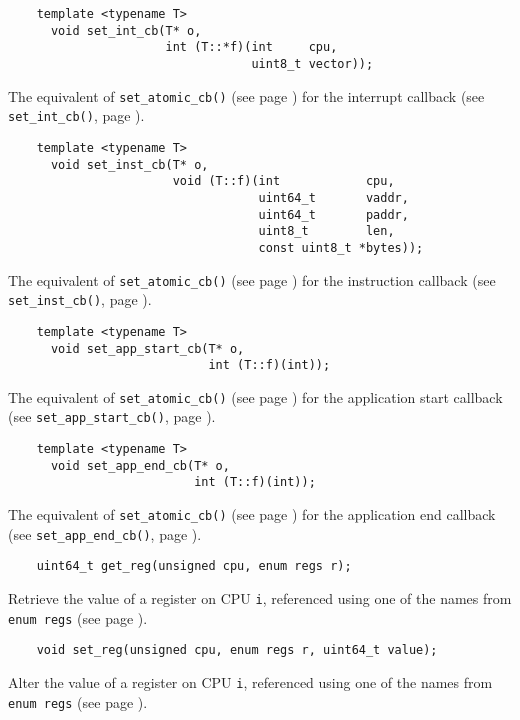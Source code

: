 \documentclass[letterpaper, 10pt]{book}
\begin{document}
\label{tf:set_int_cb} \begin{verbatim}
    template <typename T>
      void set_int_cb(T* o,
                      int (T::*f)(int     cpu, 
                                  uint8_t vector));
\end{verbatim}
The equivalent of \texttt{set\_atomic\_cb()} (see page
\pageref{tf:set_atomic_cb}) for the interrupt callback (see 
\texttt{set\_int\_cb()}, page \pageref{func:set_int_cb}).

\label{tf:set_inst_cb} \begin{verbatim}
    template <typename T>
      void set_inst_cb(T* o,
                       void (T::f)(int            cpu,
                                   uint64_t       vaddr,
                                   uint64_t       paddr,
                                   uint8_t        len,
                                   const uint8_t *bytes));
\end{verbatim}
The equivalent of \texttt{set\_atomic\_cb()} (see page
\pageref{tf:set_atomic_cb}) for the instruction callback (see 
\texttt{set\_inst\_cb()}, page \pageref{func:set_inst_cb}).

\label{tf:set_app_start_cb} \begin{verbatim}
    template <typename T>
      void set_app_start_cb(T* o,
                            int (T::f)(int));
\end{verbatim}
The equivalent of \texttt{set\_atomic\_cb()} (see page
\pageref{tf:set_atomic_cb}) for the application start callback (see
\texttt{set\_app\_start\_cb()}, page \pageref{func:set_app_start_cb}).

\label{tf:set_app_end_cb} \begin{verbatim}
    template <typename T>
      void set_app_end_cb(T* o,
                          int (T::f)(int));
\end{verbatim}
The equivalent of \texttt{set\_atomic\_cb()} (see page 
\pageref{tf:set_atomic_cb}) for the application end callback (see 
\texttt{set\_app\_end\_cb()}, page \pageref{func:set_app_end_cb}).

\label{func:get_reg} \begin{verbatim}
    uint64_t get_reg(unsigned cpu, enum regs r);
\end{verbatim}
Retrieve the value of a register on CPU \texttt{i}, referenced using one of the
names from \texttt{enum regs} (see page \pageref{enum:regs}).

\label{func:set_reg} \begin{verbatim}
    void set_reg(unsigned cpu, enum regs r, uint64_t value);
\end{verbatim}
Alter the value of a register on CPU \texttt{i}, referenced using one of the
names from \texttt{enum regs} (see page \pageref{enum:regs}).
\end{document}
